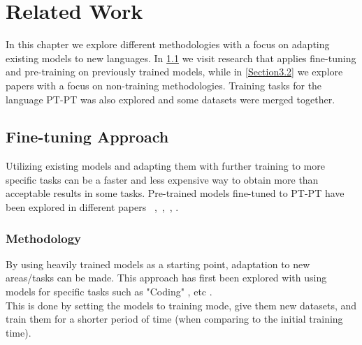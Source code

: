 
\chapter{Related Work}
\label{Section3}





In this chapter we explore different methodologies with a focus on adapting existing models to new languages. In \ref{Section3.1} we visit research that applies fine-tuning and pre-training on previously trained models, while in \ref{Section3.2} we explore papers with a focus on non-training methodologies.
Training tasks for the language PT-PT was also explored and some datasets were merged together.


\section{Fine-tuning Approach}\label{Section3.1}
Utilizing existing models and adapting them with further training to more specific tasks can be a faster and less expensive way to obtain more than acceptable results in some tasks.
Pre-trained models fine-tuned to PT-PT have been explored in different papers ~\citet{Gloria},~\citet{Sabia},~\citet{Gervasio}, \citet{Albertina}.\\

\subsection{Methodology}
By using heavily trained models as a starting point, adaptation to new areas/tasks can be made. This approach has first been explored with using models for specific tasks such as "Coding" , etc .\\
This is done by setting the models to training mode, give them new datasets, and train them for a shorter period of time (when comparing to the initial training time).\\

